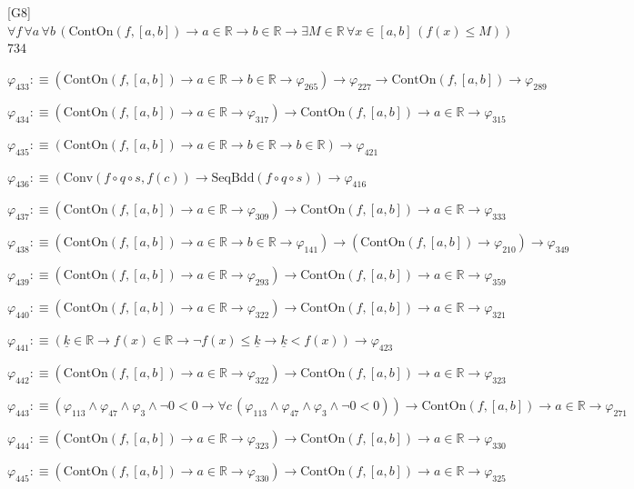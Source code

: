\begin{fullproof}{[G8]}{$\forall f\,\forall a\,\forall b\,(\mathrm{ContOn}(f,[a,b]) \to a \in \mathbb{R} \to b \in \mathbb{R} \to \exists M \in \mathbb{R}\,\forall x \in [a,b]\,(f(x) \leq M))$}{734}
\begin{abbrevlist}
\item $\varphi_{433} :\equiv (\mathrm{ContOn}(f,[a,b]) \to a \in \mathbb{R} \to b \in \mathbb{R} \to \varphi_{265}) \to \varphi_{227} \to \mathrm{ContOn}(f,[a,b]) \to \varphi_{289}$
\item $\varphi_{434} :\equiv (\mathrm{ContOn}(f,[a,b]) \to a \in \mathbb{R} \to \varphi_{317}) \to \mathrm{ContOn}(f,[a,b]) \to a \in \mathbb{R} \to \varphi_{315}$
\item $\varphi_{435} :\equiv (\mathrm{ContOn}(f,[a,b]) \to a \in \mathbb{R} \to b \in \mathbb{R} \to b \in \mathbb{R}) \to \varphi_{421}$
\item $\varphi_{436} :\equiv (\mathrm{Conv}(f \circ q \circ s,f(c)) \to \mathrm{SeqBdd}(f \circ q \circ s)) \to \varphi_{416}$
\item $\varphi_{437} :\equiv (\mathrm{ContOn}(f,[a,b]) \to a \in \mathbb{R} \to \varphi_{309}) \to \mathrm{ContOn}(f,[a,b]) \to a \in \mathbb{R} \to \varphi_{333}$
\item $\varphi_{438} :\equiv (\mathrm{ContOn}(f,[a,b]) \to a \in \mathbb{R} \to b \in \mathbb{R} \to \varphi_{141}) \to (\mathrm{ContOn}(f,[a,b]) \to \varphi_{210}) \to \varphi_{349}$
\item $\varphi_{439} :\equiv (\mathrm{ContOn}(f,[a,b]) \to a \in \mathbb{R} \to \varphi_{293}) \to \mathrm{ContOn}(f,[a,b]) \to a \in \mathbb{R} \to \varphi_{359}$
\item $\varphi_{440} :\equiv (\mathrm{ContOn}(f,[a,b]) \to a \in \mathbb{R} \to \varphi_{322}) \to \mathrm{ContOn}(f,[a,b]) \to a \in \mathbb{R} \to \varphi_{321}$
\item $\varphi_{441} :\equiv (\underline{k} \in \mathbb{R} \to f(x) \in \mathbb{R} \to \neg f(x) \leq \underline{k} \to \underline{k} < f(x)) \to \varphi_{423}$
\item $\varphi_{442} :\equiv (\mathrm{ContOn}(f,[a,b]) \to a \in \mathbb{R} \to \varphi_{322}) \to \mathrm{ContOn}(f,[a,b]) \to a \in \mathbb{R} \to \varphi_{323}$
\item $\varphi_{443} :\equiv (\varphi_{113} \land \varphi_{47} \land \varphi_{3} \land \neg 0 < 0 \to \forall c\,(\varphi_{113} \land \varphi_{47} \land \varphi_{3} \land \neg 0 < 0)) \to \mathrm{ContOn}(f,[a,b]) \to a \in \mathbb{R} \to \varphi_{271}$
\item $\varphi_{444} :\equiv (\mathrm{ContOn}(f,[a,b]) \to a \in \mathbb{R} \to \varphi_{323}) \to \mathrm{ContOn}(f,[a,b]) \to a \in \mathbb{R} \to \varphi_{330}$
\item $\varphi_{445} :\equiv (\mathrm{ContOn}(f,[a,b]) \to a \in \mathbb{R} \to \varphi_{330}) \to \mathrm{ContOn}(f,[a,b]) \to a \in \mathbb{R} \to \varphi_{325}$

\end{abbrevlist}
\end{fullproof}

